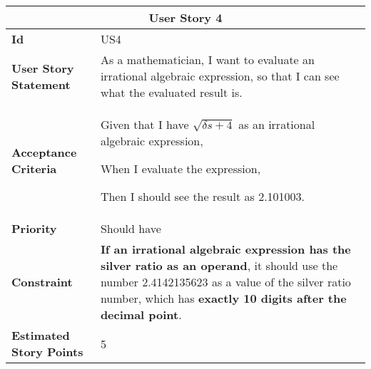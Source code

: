 \hspace{1cm}
\begin{center}
\begin{tabular}{ | m{2.3cm} | m{12cm} | } 

 \hline
 \multicolumn{2}{|c|}{\textbf{User Story 4}} \\

\hline
\textbf{Id} & US4 \\ 

\hline
\textbf{User Story Statement} & As a mathematician, I want to evaluate an irrational algebraic expression, so that I can see what the evaluated result is. \\ 

\hline
\textbf{Acceptance Criteria} & Given that I have $\sqrt{\delta s + 4}$ as an irrational algebraic expression,

When I evaluate the expression,

Then I should see the result as 2.101003.\\

\hline
\textbf{Priority} & Should have \\ 

\hline
\textbf{Constraint} & \textbf{If an irrational algebraic expression has the silver ratio as an operand}, it should use the number 2.4142135623 as a value of the silver ratio number, which has \textbf{exactly 10 digits after the decimal point}.\\

\hline
\textbf{Estimated Story Points} & 5 \\ 
\hline

\end{tabular}
\end{center}

